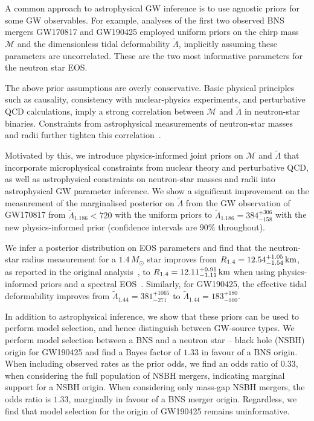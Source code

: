 \documentclass[twocolumn,linenumbers]{aastex631}
\begin{document}
A common approach to astrophysical GW inference is to use agnostic priors
for some GW observables. For example, analyses of the first two observed
BNS mergers GW170817 \citep[e.g.,][]{abbott17_170817observation,
  abbott18_170817EOS, abbott19_170817Properties} and GW190425
\citep[e.g.,][]{abbott20_190425} employed uniform priors on the chirp
mass $\mathcal{M}$ and the dimensionless tidal deformability
$\tilde{\Lambda}$, implicitly assuming these parameters are
uncorrelated. These are the two most informative parameters for the
neutron star EOS.

The above prior assumptions are overly conservative. Basic physical
principles such as causality, consistency with nuclear-physics
experiments, and perturbative QCD calculations, imply a strong
correlation between $\mathcal{M}$ and $\tilde{\Lambda}$ in neutron-star
binaries. Constraints from astrophysical measurements of neutron-star
masses and radii further tighten this correlation~\citep{Altiparmak:2022,
  Ecker:2022, Ecker:2022dlg}.

Motivated by this, we introduce physics-informed joint priors on
$\mathcal{M}$ and $\tilde{\Lambda}$ that incorporate microphysical
constraints from nuclear theory and perturbative QCD, as well as
astrophysical constraints on neutron-star masses and radii into
astrophysical GW parameter inference. We show a significant improvement
on the measurement of the marginalised posterior on $\tilde{\Lambda}$
from the GW observation of GW170817 from $\tilde{\Lambda}_{1.186} < 720$
with the uniform priors to $\tilde{\Lambda}_{1.186} = 384^{+306}_{-158}$
with the new physics-informed prior (confidence intervals are $90\%$
throughout).

We infer a posterior distribution on EOS parameters and find that the
neutron-star radius measurement for a $1.4\,{M_\odot}$ star improves from
${R_{1.4}}=12.54^{+1.05}_{-1.54}\,{\rm km}$, as reported in the original analysis~\citep{abbott19_170817Properties}, to
${R_{1.4}}=12.11^{+0.91}_{-1.11}\,{\rm km}$ when using physics-informed
priors and a spectral EOS~\citep[see also][for some of the first
  estimates made after the GW170817
  event]{Most2018,Capano2020}. Similarly, for GW190425, the effective
tidal deformability improves from $\tilde{\Lambda}_{1.44} =
381^{+1065}_{-271}$ to $\tilde{\Lambda}_{1.44} = 183^{+180}_{-100}$.

In addition to astrophysical inference, we show that these priors can be
used to perform model selection, and hence distinguish between GW-source
types. We perform model selection between a BNS and a neutron star --
black hole (NSBH) origin for GW190425 and find a Bayes factor of $1.33$
in favour of a BNS origin. When including observed rates as the prior odds,
we find an odds ratio of $0.33$, when considering the full population of
NSBH mergers, indicating marginal support for a NSBH origin.  When
considering only mass-gap NSBH mergers, the odds ratio is $1.33$,
marginally in favour of a BNS merger origin. Regardless, we find that
model selection for the origin of GW190425 remains uninformative.
	
\end{document}
